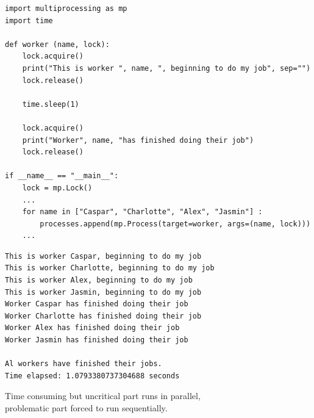 
\begin{frame}[fragile]
%
\begin{codebox}
\begin{verbatim}
import multiprocessing as mp
import time

def worker (name, lock):
    lock.acquire()
    print("This is worker ", name, ", beginning to do my job", sep="")
    lock.release()
    
    time.sleep(1)
    
    lock.acquire()
    print("Worker", name, "has finished doing their job")
    lock.release()

if __name__ == "__main__":
    lock = mp.Lock()
    ...
    for name in ["Caspar", "Charlotte", "Alex", "Jasmin"] :
        processes.append(mp.Process(target=worker, args=(name, lock)))
    ...
\end{verbatim}
\end{codebox}
%
\end{frame}


\begin{frame}[fragile]
%
\begin{cmdbox}
\begin{verbatim}
This is worker Caspar, beginning to do my job
This is worker Charlotte, beginning to do my job
This is worker Alex, beginning to do my job
This is worker Jasmin, beginning to do my job
Worker Caspar has finished doing their job
Worker Charlotte has finished doing their job
Worker Alex has finished doing their job
Worker Jasmin has finished doing their job

Al workers have finished their jobs.
Time elapsed: 1.0793380737304688 seconds
\end{verbatim}
\end{cmdbox}

\begin{center}
\Thus Time consuming but uncritical part runs in parallel,\\
	problematic part forced to run sequentially.
\end{center}
%
\end{frame}

